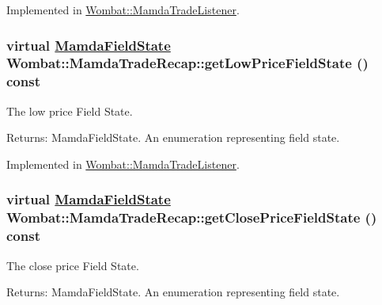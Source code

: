 Implemented in \hyperlink{classWombat_1_1MamdaTradeListener_2d9891182ae722a107f9b49dd5ecb559}{Wombat::Mamda\-Trade\-Listener}.\hypertarget{classWombat_1_1MamdaTradeRecap_db9836665c7f6b15c26f379ab680c374}{
\subsubsection[getLowPriceFieldState]{\setlength{\rightskip}{0pt plus 5cm}virtual \hyperlink{namespaceWombat_93aac974f2ab713554fd12a1fa3b7d2a}{Mamda\-Field\-State} Wombat::Mamda\-Trade\-Recap::get\-Low\-Price\-Field\-State () const}}
\label{classWombat_1_1MamdaTradeRecap_db9836665c7f6b15c26f379ab680c374}


The low price Field State. 

\begin{Desc}
\item[Returns:]Mamda\-Field\-State. An enumeration representing field state. \end{Desc}


Implemented in \hyperlink{classWombat_1_1MamdaTradeListener_5830510164c197655c2b9848a06a3e0a}{Wombat::Mamda\-Trade\-Listener}.\hypertarget{classWombat_1_1MamdaTradeRecap_a45cdea8950502d698ccdbd052b456c1}{
\subsubsection[getClosePriceFieldState]{\setlength{\rightskip}{0pt plus 5cm}virtual \hyperlink{namespaceWombat_93aac974f2ab713554fd12a1fa3b7d2a}{Mamda\-Field\-State} Wombat::Mamda\-Trade\-Recap::get\-Close\-Price\-Field\-State () const}}
\label{classWombat_1_1MamdaTradeRecap_a45cdea8950502d698ccdbd052b456c1}


The close price Field State. 

\begin{Desc}
\item[Returns:]Mamda\-Field\-State. An enumeration representing field state. \end{Desc}


